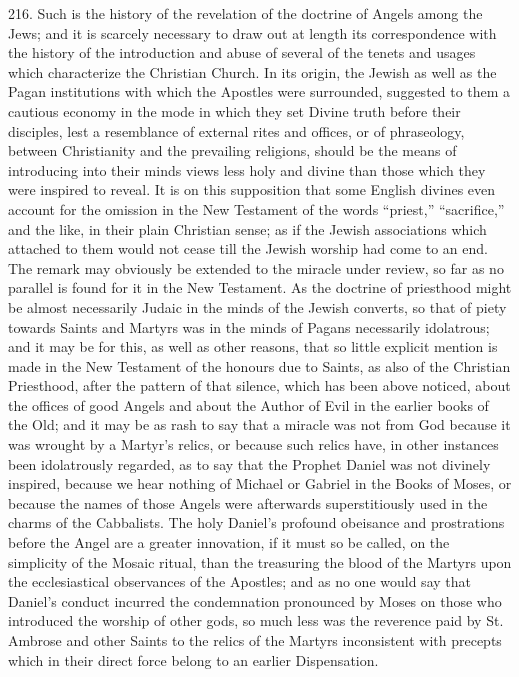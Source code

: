 216.
Such is the history of the revelation of the doctrine of Angels among
the Jews; and it is scarcely necessary to draw out at length its
correspondence with the history of the introduction and abuse of
several of the tenets and usages which characterize the Christian
Church. In its origin, the Jewish as well as the Pagan institutions
with which the Apostles were surrounded, suggested to them a cautious
economy in the mode in which they set Divine truth before their
disciples, lest a resemblance of external rites and offices, or of
phraseology, between Christianity and the prevailing religions, should
be the means of introducing into their minds views less holy and
divine than those which they were inspired to reveal. It is on this
supposition that some English divines even account for the omission in
the New Testament of the words ``priest,'' ``sacrifice,'' and the like, in
their plain Christian sense; as if the Jewish associations which
attached to them would not cease till the Jewish worship had come to
an end. The remark may obviously be extended to the miracle under
review, so far as no parallel is found for it in the New
Testament. As the doctrine of priesthood might be almost necessarily
Judaic in the minds of the Jewish converts, so that of piety towards
Saints and Martyrs was in the minds of Pagans necessarily idolatrous;
and it may be for this, as well as other reasons, that so little
explicit mention is made in the New Testament of the honours due to
Saints, as also of the Christian Priesthood, after the pattern of that
silence, which has been above noticed, about the offices of good
Angels and about the Author of Evil in the earlier books of the Old;
and it may be as rash to say that a miracle was not from God because
it was wrought by a Martyr's relics, or because such relics have, in
other instances been idolatrously regarded, as to say that the Prophet
Daniel was not divinely inspired, because we hear nothing of Michael
or Gabriel in the Books of Moses, or because the names of those Angels
were afterwards superstitiously used in the charms of the Cabbalists.
The holy Daniel's profound obeisance and prostrations before the Angel
are a greater innovation, if it must so be called, on the simplicity
of the Mosaic ritual, than the treasuring the blood of the Martyrs
upon the ecclesiastical observances of the Apostles; and as no one
would say that Daniel's conduct incurred the condemnation pronounced
by Moses on those who introduced the worship of other gods, so much
less was the reverence paid by St. Ambrose and other Saints to the
relics of the Martyrs inconsistent with precepts which in their
direct force belong to an earlier Dispensation.

